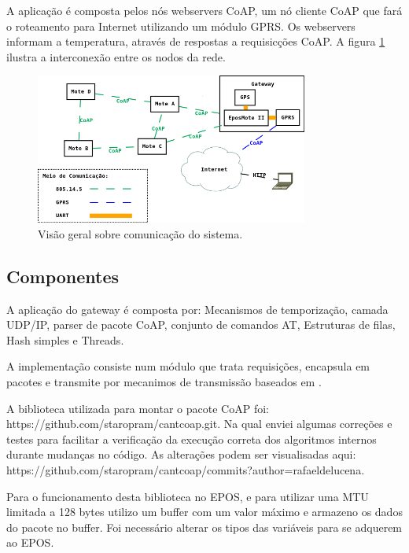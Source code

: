 A aplica\c{c}\~ao \'e composta pelos n\'os webservers CoAP, um n\'o cliente CoAP que far\'a o roteamento para Internet utilizando um m\'odulo GPRS.  Os webservers informam a temperatura, atrav\'es de respostas a requisic\c{c}\~oes CoAP. A figura \ref{arquitetura} ilustra a interconex\~ao entre os nodos da rede.

\begin{figure}[h]
   \label{arquitetura}
   \centering
   \includegraphics[width=0.8\textwidth]{figuras/arquitetura.png}
   \caption{Vis\~ao geral sobre comunica\c{c}\~ao do sistema.}
\end{figure}

\subsection{Componentes}
A aplica\c{c}\~ao do gateway \'e composta por: Mecanismos de temporiza\c{c}\~ao, camada UDP/IP, parser de pacote CoAP, conjunto de comandos AT, Estruturas de filas, Hash simples e Threads.

A implementa\c{c}\~ao consiste num m\'odulo que trata requisi\c{c}\~oes, encapsula em pacotes e transmite por mecanimos de transmiss\~ao baseados em \cite{draft-ietf-core-coap-18}.

A biblioteca utilizada para montar o pacote CoAP foi:\\https://github.com/staropram/cantcoap.git. Na qual enviei algumas corre\c{c}\~oes e testes para facilitar a verifica\c{c}\~ao da execu\c{c}\~ao correta dos algoritmos internos durante mudan\c{c}as no c\'odigo. As altera\c{c}\~oes podem ser visualisadas aqui:\\https://github.com/staropram/cantcoap/commits?author=rafaeldelucena.

Para o funcionamento desta biblioteca no EPOS, e para utilizar uma MTU limitada a 128 bytes utilizo um buffer com um valor m\'aximo e armazeno os dados do pacote no buffer. Foi necess\'ario alterar os tipos das vari\'aveis para se adquerem ao EPOS.

